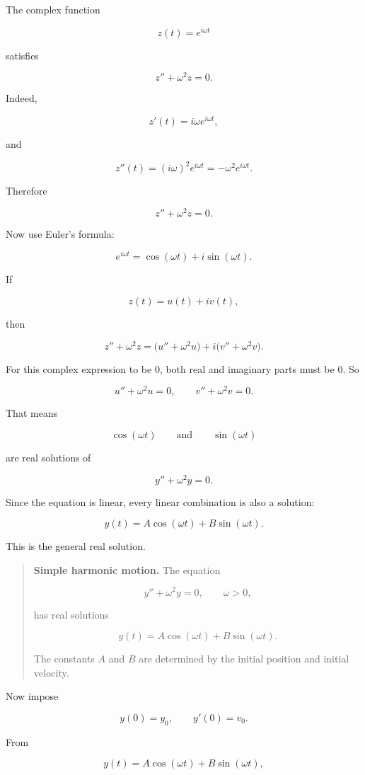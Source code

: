 The complex function

\[
z(t)=e^{i\omega t}
\]

satisfies

\[
z''+\omega^2z=0.
\]

Indeed,

\[
z'(t)=i\omega e^{i\omega t},
\]

and

\[
z''(t)=(i\omega)^2e^{i\omega t}
=
-\omega^2e^{i\omega t}.
\]

Therefore

\[
z''+\omega^2z=0.
\]

Now use Euler's formula:

\[
e^{i\omega t}=\cos(\omega t)+i\sin(\omega t).
\]

If

\[
z(t)=u(t)+iv(t),
\]

then

\[
z''+\omega^2z
=
\bigl(u''+\omega^2u\bigr)
+
i\bigl(v''+\omega^2v\bigr).
\]

For this complex expression to be \(0\), both real and imaginary parts must be \(0\).
So

\[
u''+\omega^2u=0,
\qquad
v''+\omega^2v=0.
\]

That means

\[
\cos(\omega t)
\qquad\text{and}\qquad
\sin(\omega t)
\]

are real solutions of

\[
y''+\omega^2y=0.
\]

Since the equation is linear, every linear combination is also a solution:

\[
\boxed{
y(t)=A\cos(\omega t)+B\sin(\omega t).
}
\]

This is the general real solution.

\begin{quote}
\textbf{Simple harmonic motion.}
The equation

\[
\boxed{
y''+\omega^2y=0,
\qquad \omega>0,
}
\]

has real solutions

\[
\boxed{
y(t)=A\cos(\omega t)+B\sin(\omega t).
}
\]

The constants \(A\) and \(B\) are determined by the initial position and initial velocity.
\end{quote}

Now impose

\[
y(0)=y_0,
\qquad
y'(0)=v_0.
\]

From

\[
y(t)=A\cos(\omega t)+B\sin(\omega t),
\]

